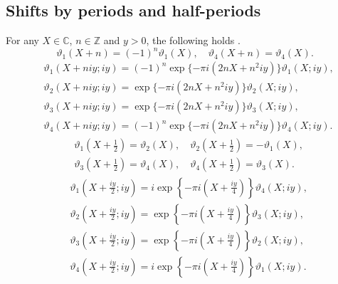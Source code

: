 \documentclass[10pt,leqno]{amsart}
\numberwithin{equation}{section}
\begin{document}
\subsection{Shifts by periods and half-periods}
For any $X\in\mathbb{C}$, $n\in\mathbb{Z}$ and $y>0$, the following holds \cite{Mumford:Tata_I,Khachev_Zabrodin:theta}.
\begin{equation}\label{peri1}
\vartheta_1\left(X+n\right)=(-1)^{n}\vartheta_1\left(X\right),\quad\vartheta_4\left(X+n\right)=\vartheta_4\left(X\right).
\end{equation}
\begin{equation}\label{cl}
\begin{split}
&\vartheta_1\left(X+niy; iy\right)=(-1)^{n}\exp\{-\pi i\left(2nX+n^{2}iy\right)\}\vartheta_1\left(X;iy\right),\\
&\vartheta_2\left(X+niy;iy\right)=\exp\{-\pi i\left(2nX+n^{2}iy\right)\}\vartheta_2\left(X;iy\right),\\
&\vartheta_3\left(X+niy;iy\right)=\exp\{-\pi i\left(2nX+n^{2}iy\right)\}\vartheta_3\left(X;iy\right),\\
&\vartheta_4\left(X+niy;iy\right)=(-1)^{n}\exp\{-\pi i\left(2nX+n^{2}iy\right)\}\vartheta_4\left(X;iy\right).
\end{split}
\end{equation}
\begin{equation}\label{clclcl}
\begin{split}
&\vartheta_1\left(X+\frac{1}{2}\right)=\vartheta_2\left(X\right),\quad \vartheta_2\left(X+\frac{1}{2}\right)=-\vartheta_1\left(X\right),\\
&\vartheta_3\left(X+\frac{1}{2}\right)=\vartheta_4\left(X\right),\quad\vartheta_4\left(X+\frac{1}{2}\right)=\vartheta_3\left(X\right).
\end{split}
\end{equation}
\begin{equation}\label{clclcl2}
\begin{split}
&\vartheta_1\left(X+\frac{iy}{2};iy\right)=i\exp\left\{-\pi i\left(X+\frac{iy}{4}\right)\right\}\vartheta_4\left(X;iy\right),\\
&\vartheta_2\left(X+\frac{iy}{2};iy\right)=\exp\left\{-\pi i\left(X+\frac{iy}{4}\right)\right\}\vartheta_3\left(X;iy\right),\\
&\vartheta_3\left(X+\frac{iy}{2};iy\right)=\exp\left\{-\pi i\left(X+\frac{iy}{4}\right)\right\}\vartheta_2\left(X;iy\right),\\
&\vartheta_4\left(X+\frac{iy}{2};iy\right)=i\exp\left\{-\pi i\left(X+\frac{iy}{4}\right)\right\}\vartheta_1\left(X;iy\right).
\end{split}
\end{equation}
\end{document}
